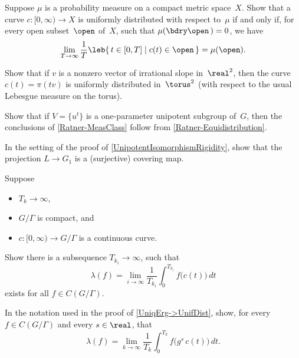 \begin{exercises}

\item \label{UnifDistVisitsOpenSets}
Suppose $\mu$ is a probability measure on a compact metric space~$X$. Show that a curve $c \colon [0,\infty) \to X$ is uniformly distributed with respect to~$\mu$ if and only if, for every open subset~$\open$ of~$X$, such that $\mu( \bdry \open\,) = 0$, we have
	$$ \lim_{T \to \infty} \frac{1}{T} \leb \{\, t \in [0,T] \mid c(t) \in \open \,\} = \mu(\open) .$$

\item Show that if $v$ is a nonzero vector of irrational slope in~$\real^2$, then the curve
	$ c(t) = \pi(tv)$
is uniformly distributed in~$\torus^2$ (with respect to the usual Lebesgue measure on the torus).

\item \label{EquiDist->MeasuresEx}
Show that if $V = \{u^t\}$ is a one-parameter unipotent subgroup of~$G$, then the conclusions of \cref{Ratner-MeasClass} follow from \cref{Ratner-Equidistribution}.

\item \label{UnipotentIsomorphismRigidity-coveringmapEx}
In the setting of the proof of \cref{UnipotentIsomorphismRigidity}, show that the projection $L \to G_1$ is a (surjective) covering map.

\item \label{UniqErg->UnifDistPf-LimExistsEx}
Suppose 
	\begin{itemize}
	\item $T_k \to \infty$,
	\item $G/\Gamma$ is compact,
	and
	\item $c \colon [0,\infty) \to G/\Gamma$ is a continuous curve.
	\end{itemize}
Show there is a subsequence $T_{k_i} \to \infty$, such that
	$$ \lambda(f) = \lim_{i \to \infty} \frac{1}{T_{k_i}} \int_0^{T_{k_i}} f \bigl( c(t) \bigr) \, dt $$
exists for all $f \in C(G/\Gamma)$.

\item \label{UniqErg->UnifDistPf-gInvt}
In the notation used in the proof of \cref{UniqErg->UnifDist}, show, for every $f \in C(G/\Gamma)$ and every $s \in \real$, that
	$$ \lambda(f) = \lim_{k \to \infty} \frac{1}{T_k} \int_0^{T_k} f \bigl( g^s \, c(t) \bigr) \, dt .$$

\end{exercises}







